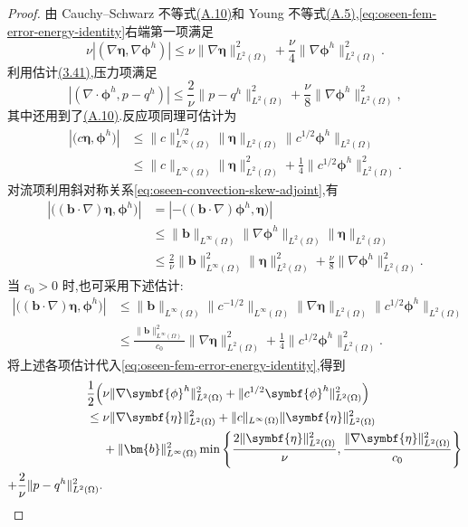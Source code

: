 \begin{proof}
由 Cauchy--Schwarz 不等式\hyperref[eq:appendix-a-10]{(A.10)}和 Young 不等式\hyperref[eq:appendix-a-5]{(A.5)},\cref{eq:oseen-fem-error-energy-identity}右端第一项满足
\[
\nu\left|(\nabla\symbf{\eta},\nabla\symbf{\phi}^h)\right|
  \le \nu\|\nabla\symbf{\eta}\|_{L^2(\Omega)}^2
       +\frac{\nu}{4}\|\nabla\symbf{\phi}^h\|_{L^2(\Omega)}^2.
\]
利用估计\hyperref[eq:divergence-gradient-bound-h1]{(3.41)},压力项满足
\[
\left|(\nabla\cdot\symbf{\phi}^h,p-q^h)\right|
  \le\frac{2}{\nu}\|p-q^h\|_{L^2(\Omega)}^2
       +\frac{\nu}{8}\|\nabla\symbf{\phi}^h\|_{L^2(\Omega)}^2,
\]
其中还用到了\hyperref[eq:appendix-a-10]{(A.10)}.反应项同理可估计为
\[
\begin{aligned}
\left|\bigl(c\symbf{\eta},\symbf{\phi}^h\bigr)\right|
  &\le \|c\|_{L^\infty(\Omega)}^{1/2}
       \|\symbf{\eta}\|_{L^2(\Omega)}
       \|c^{1/2}\symbf{\phi}^h\|_{L^2(\Omega)}\\
  &\le \|c\|_{L^\infty(\Omega)}
       \|\symbf{\eta}\|_{L^2(\Omega)}^2
       +\frac14\|c^{1/2}\symbf{\phi}^h\|_{L^2(\Omega)}^2.
\end{aligned}
\]
对流项利用斜对称关系\cref{eq:oseen-convection-skew-adjoint},有
\[
\begin{aligned}
\left|\bigl((\bm{b}\cdot\nabla)\symbf{\eta},
      \symbf{\phi}^h\bigr)\right|
  &=\left|-\bigl((\bm{b}\cdot\nabla)\symbf{\phi}^h,
       \symbf{\eta}\bigr)\right|\\
  &\le \|\bm{b}\|_{L^\infty(\Omega)}
       \|\nabla\symbf{\phi}^h\|_{L^2(\Omega)}
       \|\symbf{\eta}\|_{L^2(\Omega)}\\
  &\le \frac{2}{\nu}\|\bm{b}\|_{L^\infty(\Omega)}^2
        \|\symbf{\eta}\|_{L^2(\Omega)}^2
        +\frac{\nu}{8}\|\nabla\symbf{\phi}^h\|_{L^2(\Omega)}^2.
\end{aligned}
\]
当 $c_0>0$ 时,也可采用下述估计:
\[
\begin{aligned}
\left|\bigl((\bm{b}\cdot\nabla)\symbf{\eta},
      \symbf{\phi}^h\bigr)\right|
  &\le \|\bm{b}\|_{L^\infty(\Omega)}
       \|c^{-1/2}\|_{L^\infty(\Omega)}
       \|\nabla\symbf{\eta}\|_{L^2(\Omega)}
       \|c^{1/2}\symbf{\phi}^h\|_{L^2(\Omega)}\\
  &\le \frac{\|\bm{b}\|_{L^\infty(\Omega)}^2}{c_0}
        \|\nabla\symbf{\eta}\|_{L^2(\Omega)}^2
        +\frac14\|c^{1/2}\symbf{\phi}^h\|_{L^2(\Omega)}^2.
\end{aligned}
\]
将上述各项估计代入\cref{eq:oseen-fem-error-energy-identity},得到
\begin{equation}\label{eq:oseen-fem-error-energy-bound}
\begin{aligned}
  \frac12\Bigl(&\nu\|\nabla\symbf{\phi}^h\|_{L^2(\Omega)}^2
        +\|c^{1/2}\symbf{\phi}^h\|_{L^2(\Omega)}^2\Bigr)\\
  \le{}&\nu\|\nabla\symbf{\eta}\|_{L^2(\Omega)}^2
       +\|c\|_{L^\infty(\Omega)}
          \|\symbf{\eta}\|_{L^2(\Omega)}^2\\
   &+\|\bm{b}\|_{L^\infty(\Omega)}^2
       \min\left\{
         \frac{2\|\symbf{\eta}\|_{L^2(\Omega)}^2}{\nu},
         \frac{\|\nabla\symbf{\eta}\|_{L^2(\Omega)}^2}{c_0}
       \right\}\\
       +\frac{2}{\nu}\|p-q^h\|_{L^2(\Omega)}^2 .
\end{aligned}
\end{equation}


\end{proof}
